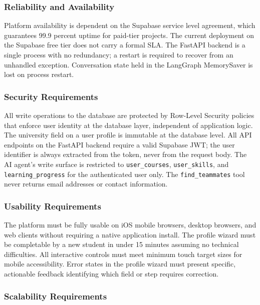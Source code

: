 \documentclass[12pt,a4paper]{article}
\begin{document}
\subsubsection{Reliability and Availability}

Platform availability is dependent on the Supabase service level agreement, which
guarantees 99.9 percent uptime for paid-tier projects. The current deployment on the
Supabase free tier does not carry a formal SLA. The FastAPI backend is a single process
with no redundancy; a restart is required to recover from an unhandled exception.
Conversation state held in the LangGraph MemorySaver is lost on process restart.

\subsubsection{Security Requirements}

All write operations to the database are protected by Row-Level Security policies that
enforce user identity at the database layer, independent of application logic. The
university field on a user profile is immutable at the database level. All API endpoints
on the FastAPI backend require a valid Supabase JWT; the user identifier is always
extracted from the token, never from the request body. The AI agent's write surface is
restricted to \texttt{user\_courses}, \texttt{user\_skills}, and \texttt{learning\_progress}
for the authenticated user only. The \texttt{find\_teammates} tool never returns email
addresses or contact information.

\subsubsection{Usability Requirements}

The platform must be fully usable on iOS mobile browsers, desktop browsers, and web
clients without requiring a native application install. The profile wizard must be
completable by a new student in under 15 minutes assuming no technical difficulties.
All interactive controls must meet minimum touch target sizes for mobile accessibility.
Error states in the profile wizard must present specific, actionable feedback
identifying which field or step requires correction.

\subsubsection{Scalability Requirements}
\end{document}
